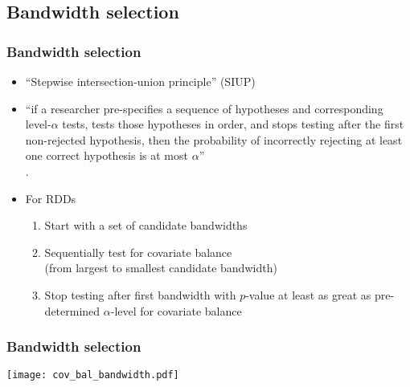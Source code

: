 \documentclass[table, xcolor = {dvipsnames}, 9pt]{beamer}
\theoremstyle{plain}
\begin{document}
\subsection{Bandwidth selection}
\begin{frame}
\frametitle{Bandwidth selection} 
\begin{itemize} \vfill
\item ``Stepwise intersection-union principle'' (SIUP) \\ \citep{hansensales2015,rosenbaum2008,berger1988} \vfill
\item[] ``if a researcher pre-specifies a sequence of hypotheses and corresponding level-$\alpha$ tests, tests those hypotheses in order, and stops testing after the first non-rejected hypothesis, then the probability of incorrectly rejecting at least one correct hypothesis is at most $\alpha$'' \\ \citep[p. 185]{hansensales2015}. \vfill
\item For RDDs \vfill
\begin{enumerate} \vfill
\item Start with a set of candidate bandwidths \vfill
\item Sequentially test for covariate balance \\ (from largest to smallest candidate bandwidth) \vfill
\item Stop testing after first bandwidth with $p$-value at least as great as pre-determined $\alpha$-level for covariate balance \vfill
\end{enumerate} \vfill
\end{itemize} \vfill
\end{frame}
\begin{frame}
\frametitle{Bandwidth selection} 
\vfill
\begin{center}
\texttt{[image: cov\_bal\_bandwidth.pdf]}
\end{center}
\vfill
\end{frame}
\end{document}
